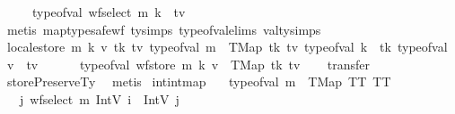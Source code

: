 \begin{isabellebody}
\ \ \ \ {\isasymLongrightarrow}\ type{\isacharunderscore}{\kern0pt}of{\isacharunderscore}{\kern0pt}val\ {\isacharparenleft}{\kern0pt}wf{\isacharunderscore}{\kern0pt}select\ m\ k{\isacharparenright}{\kern0pt}\ {\isacharequal}{\kern0pt}\ tv{\isachardoublequoteclose}\isanewline
%
\isadelimproof
\ \ %
\endisadelimproof
%
\isatagproof
{}\isamarkupfalse%
\ {\isacharparenleft}{\kern0pt}metis\ map{\isacharunderscore}{\kern0pt}type{\isacharunderscore}{\kern0pt}safe{\isacharunderscore}{\kern0pt}wf\ ty{\isachardot}{\kern0pt}simps{\isacharparenleft}{\kern0pt}{}{}{\isacharcomma}{\kern0pt}{}{}{\isacharparenright}{\kern0pt}\ type{\isacharunderscore}{\kern0pt}of{\isacharunderscore}{\kern0pt}val{\isachardot}{\kern0pt}elims\ val{\isacharunderscore}{\kern0pt}ty{\isachardot}{\kern0pt}simps{\isacharparenleft}{\kern0pt}{}{\isacharparenright}{\kern0pt}{\isacharparenright}{\kern0pt}%
\endisatagproof
{\isafoldproof}%
%
\isadelimproof
\isanewline
%
\endisadelimproof
\isanewline
{}\isamarkupfalse%
\ locale{\isacharunderscore}{\kern0pt}store{\isacharcolon}{\kern0pt}\ {\isachardoublequoteopen}{\isasymAnd}m\ k\ v\ tk\ tv{\isachardot}{\kern0pt}\ {\isasymlbrakk}type{\isacharunderscore}{\kern0pt}of{\isacharunderscore}{\kern0pt}val\ m\ {\isacharequal}{\kern0pt}\ TMap\ tk\ tv{\isacharsemicolon}{\kern0pt}\ type{\isacharunderscore}{\kern0pt}of{\isacharunderscore}{\kern0pt}val\ k\ {\isacharequal}{\kern0pt}\ tk{\isacharsemicolon}{\kern0pt}\ type{\isacharunderscore}{\kern0pt}of{\isacharunderscore}{\kern0pt}val\ v\ {\isacharequal}{\kern0pt}\ tv\ {\isasymrbrakk}\isanewline
\ \ \ \ {\isasymLongrightarrow}\ type{\isacharunderscore}{\kern0pt}of{\isacharunderscore}{\kern0pt}val\ {\isacharparenleft}{\kern0pt}wf{\isacharunderscore}{\kern0pt}store\ m\ k\ v{\isacharparenright}{\kern0pt}\ {\isacharequal}{\kern0pt}\ TMap\ tk\ tv{\isachardoublequoteclose}\isanewline
%
\isadelimproof
\ \ %
\endisadelimproof
%
\isatagproof
{}\isamarkupfalse%
\ transfer\isanewline
\ \ \isamarkupfalse%
\ storePreserveTy\ \isamarkupfalse%
\ metis%
\endisatagproof
{\isafoldproof}%
%
\isadelimproof
\isanewline
%
\endisadelimproof
\isanewline
{}\isamarkupfalse%
\ intintmap{\isacharcolon}{\kern0pt}\isanewline
\ \ \ {\isachardoublequoteopen}type{\isacharunderscore}{\kern0pt}of{\isacharunderscore}{\kern0pt}val\ m\ {\isacharequal}{\kern0pt}\ TMap\ TT\ TT{\isachardoublequoteclose}\isanewline
\ \ \ {\isachardoublequoteopen}{\isasymexists}j{\isachardot}{\kern0pt}\ {\isacharparenleft}{\kern0pt}wf{\isacharunderscore}{\kern0pt}select\ m\ {\isacharparenleft}{\kern0pt}IntV\ i{\isacharparenright}{\kern0pt}{\isacharparenright}{\kern0pt}\ {\isacharequal}{\kern0pt}\ IntV\ j{\isachardoublequoteclose}\isanewline

\end{isabellebody}
